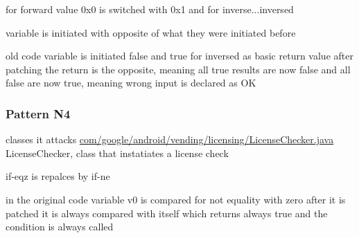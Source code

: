 

for forward value 0x0 is switched with 0x1 and for inverse...inversed



variable is initiated with opposite of what they were initiated before




old code variable is initiated false and true for inversed as basic return value
after patching the return is the opposite, meaning all true results are now false and all false are now true, meaning wrong input is declared as OK
\subsubsection{Pattern N4}
classes it attacks
\url{com/google/android/vending/licensing/LicenseChecker.java}
LicenseChecker, class that instatiates a license check\cite{developersLicensingReference}



if-eqz is repalces by if-ne


in the original code variable v0 is compared for not equality with zero
after it is patched it is always compared with itself which returns always true and the condition is always called



